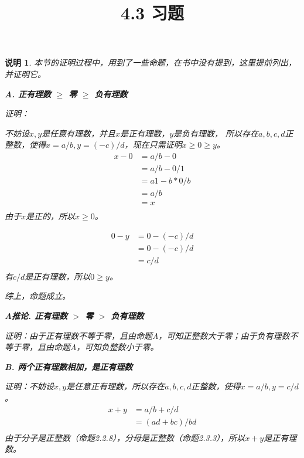 \documentclass{article}
\theoremstyle{mystyle}
\newtheorem*{zremark}{说明}
\begin{document}
\title{4.3 习题}
\maketitle

\begin{zgraytheorem}
  \begin{zremark}
    本节的证明过程中，用到了一些命题，在书中没有提到，这里提前列出，并证明它。

    \textbf{A. 正有理数 $\geq$ 零 $\geq$ 负有理数}

    证明：

    不妨设$x,y$是任意有理数，并且$x$是正有理数，$y$是负有理数，
    所以存在$a,b,c,d$正整数，使得$x=a/b,y=(-c)/d$，现在只需证明$x \geq 0 \geq y$。
    \begin{align*}
      x - 0 & = a/b - 0   \\
            & = a/b - 0/1 \\
            & = a1-b*0/b  \\
            & = a / b     \\
            & = x         \\
    \end{align*}
    由于$x$是正的，所以$x \geq 0$。

    \begin{align*}
      0 - y & = 0 - (-c)/d \\
            & = 0 - (-c)/d \\
            & = c/d        \\
    \end{align*}
    有$c/d$是正有理数，所以$0 \geq y$。

    综上，命题成立。

    \textbf{A推论. 正有理数 $>$ 零 $>$ 负有理数}

    证明：由于正有理数不等于零，且由命题A，可知正整数大于零；由于负有理数不等于零，且由命题A，可知负整数小于零。

    \textbf{B. 两个正有理数相加，是正有理数}

    证明：不妨设$x,y$是任意正有理数，所以存在$a,b,c,d$正整数，使得$x=a/b,y=c/d$。
    \begin{align*}
      x + y & = a/b + c/d      \\
            & = (ad + bc) / bd \\
    \end{align*}
    由于分子是正整数（命题2.2.8），分母是正整数（命题2.3.3），所以$x+y$是正有理数。


  \end{zremark}
\end{zgraytheorem}
\end{document}
